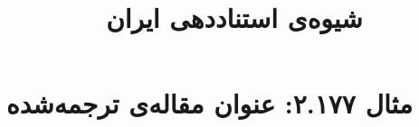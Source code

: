\documentclass[a4paper,10pt]{article}
\begin{document}
\title{شیوه‌ی استناددهی ایران
 }
\author{}
\date{}
\maketitle



\section*{مثال ۲.۱۷۷: عنوان مقاله‌ی ترجمه‌شده}

\cite{kern1938}\\
\cite{ching1983}\\






\end{document}
